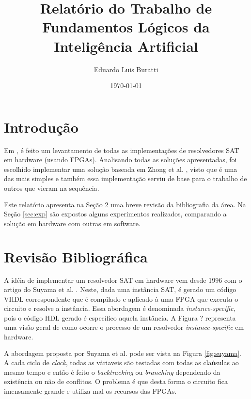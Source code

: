 \documentclass[12pt,a4paper]{article}
\begin{document}
\title{Relatório do Trabalho de Fundamentos Lógicos da Inteligência Artificial}
\author{Eduardo Luis Buratti}
\date{\today}

\maketitle

\section{Introdução}

Em \cite{skliarova2004reconfigurablehardware}, é feito um levantamento de todas as implementações de resolvedores SAT em hardware (usando FPGAs). Analisando todas as soluções apresentadas, foi escolhido implementar uma solução baseada em Zhong et al. \cite{zhong1998usingreconfigurable}, visto que é uma das mais simples e também essa implementação serviu de base para o trabalho de outros que vieram na sequência.

Este relatório apresenta na Seção \ref{sec:rev} uma breve revisão da bibliografia da área. Na Seção \ref{sec:exp} são expostos alguns experimentos realizados, comparando a solução em hardware com outras em software.

\section{Revisão Bibliográfica}
\label{sec:rev}

A idéia de implementar um resolvedor SAT em hardware vem desde 1996 com o artigo do Suyama et al. \cite{suyama1996solvingsatisfiability}. Neste, dada uma instância SAT, é gerado um código VHDL correspondente que é compilado e aplicado à uma FPGA que executa o circuito e resolve a instância. Essa abordagem é denominada \textit{instance-specific}, pois o código HDL gerado é específico aquela instância. A Figura ? representa uma visão geral de como ocorre o processo de um resolvedor \textit{instance-specific} em hardware.

A abordagem proposta por Suyama et al. \cite{suyama1996solvingsatisfiability} pode ser vista na Figura \ref{fig:suyama}. A cada ciclo de \textit{clock}, todas as váriaveis são testadas com todas as claúsulas ao mesmo tempo e então é feito o \textit{backtracking} ou \textit{branching} dependendo da existência ou não de conflitos. O problema é que desta forma o circuito fica imensamente grande e utiliza mal os recursos das FPGAs.
\end{document}
